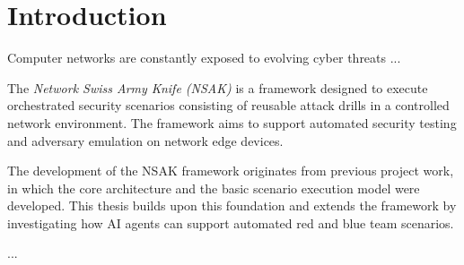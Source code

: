 \chapter{Introduction}

Computer networks are constantly exposed to evolving cyber threats ...

The \textit{Network Swiss Army Knife (NSAK)} is a framework designed to execute orchestrated security scenarios consisting of reusable attack drills in a controlled network environment. The framework aims to support
automated security testing and adversary emulation on network edge devices.

The development of the NSAK framework originates from previous project work,
in which the core architecture and the basic scenario execution model were developed. This thesis builds upon this foundation and extends the framework by investigating how AI agents can support automated red and blue team scenarios.

... 

